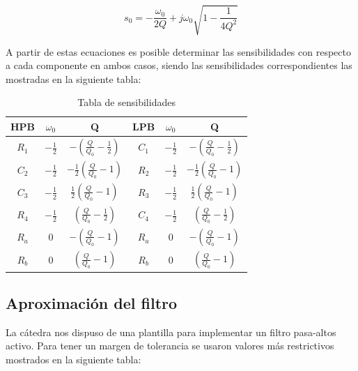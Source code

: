\begin{equation}
s_0 = -\frac{\omega_0}{2Q} + j\omega_0 \sqrt{1-\frac{1}{4Q^2}}
\label{eq s0}
\end{equation}

A partir de estas ecuaciones es posible determinar las sensibilidades con respecto a cada componente en ambos casos, siendo las sensibilidades correspondientes las mostradas en la siguiente tabla:

\begin{table}[h]
\begin{tabular}{@{}|c|c|c|c|c|c|@{}}
\toprule
\textbf{HPB} & \textbf{$\omega_0$} & \textbf{Q}                         & \textbf{LPB} & \textbf{$\omega_0$} & \textbf{Q}                         \\ 
\midrule
$R_1$         & $-\frac{1}{2}$                      & $-(\frac{Q}{Q_0} - \frac{1}{2})$    & $C_1$         & $-\frac{1}{2}$                      & $-(\frac{Q}{Q_0} - \frac{1}{2})$    \\
$C_2$         & $-\frac{1}{2}$                      & $-\frac{1}{2} (\frac{Q}{Q_0} - 1)$ & $R_2$         & $-\frac{1}{2}$                      & $-\frac{1}{2} (\frac{Q}{Q_0} - 1)$ \\
$C_3$         & $-\frac{1}{2}$                      & $\frac{1}{2} (\frac{Q}{Q_0} - 1)$  & $R_3$          & $-\frac{1}{2}$                      & $\frac{1}{2} (\frac{Q}{Q_0} - 1)$  \\
$R_4$         & $-\frac{1}{2}$                      & $(\frac{Q}{Q_0} - \frac{1}{2})$     & $C_4$         & $-\frac{1}{2}$                      & $(\frac{Q}{Q_0} - \frac{1}{2})$     \\
$R_a$         & 0                                   & $- (\frac{Q}{Q_0} - 1)$            & $R_a$         & 0                                   & $- (\frac{Q}{Q_0} - 1)$            \\
$R_b$         & 0                                   & $ (\frac{Q}{Q_0} - 1)$             & $R_b$         & 0                                   & $ (\frac{Q}{Q_0} - 1)$            
\end{tabular}
\centering
\caption{Tabla de sensibilidades}
\label{tabla sensibilidades}
\end{table}

\subsection{Aproximación del filtro}

La cátedra nos dispuso de una plantilla para implementar un filtro pasa-altos activo. Para tener un margen de tolerancia se usaron valores más restrictivos mostrados en la siguiente tabla:

